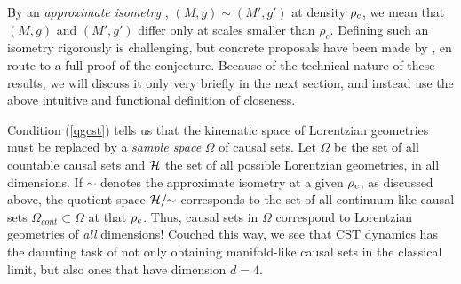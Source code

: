 By an \emph{approximate  isometry }, $(M,g) \sim (M',g')$ at density $\rho_c$, we mean that $(M,g)$ and $ (M',g')$ differ only at scales smaller
 than $\rho_c$.  Defining such an isometry  rigorously is challenging, but concrete proposals have been made by 
 \cite{bomclose,noldusone,noldustwo,bomnoldus,bomnoldustwo},  en route to a full proof of the conjecture. Because of the
 technical nature of these results, we  will discuss it only very briefly in the next
 section, and  instead use the above intuitive and functional definition of closeness. 

 Condition (\ref{qgcst}) tells us that the kinematic space of Lorentzian geometries must be replaced by a \emph{sample
   space }  $\Omega$ of causal sets.  Let $\Omega$ be the set of all 
countable causal sets and $\mathcal H$ the set of all possible Lorentzian geometries,  in all dimensions.  If $\sim$ denotes
the approximate isometry at a given $\rho_c$, as  discussed above, the quotient
space $\mathcal H/\!\!\sim$ corresponds to the set of all continuum-like causal sets $\Omega_{cont}\subset \Omega$ at that $\rho_c$.  Thus,
causal sets in 
$\Omega$  correspond to Lorentzian geometries of  \emph{all} dimensions!  Couched this way, we see that   CST dynamics
has the daunting task of not only obtaining manifold-like causal sets in the classical limit, but also ones that have dimension $d=4$.  

